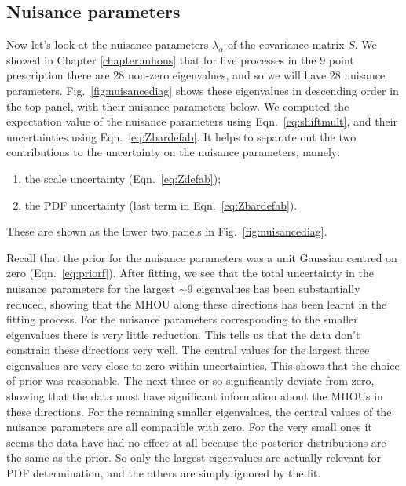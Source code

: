 \subsection{Nuisance parameters} 
Now let's look at the nuisance parameters $\lambda_\alpha$ of the covariance matrix $S$. We showed in Chapter \ref{chapter:mhous} that for five processes in the 9 point prescription there are 28 non-zero eigenvalues, and so we will have 28 nuisance parameters. Fig.~\ref{fig:nuisancediag} shows these eigenvalues in descending order in the top panel, with their nuisance parameters below. We computed the expectation value of the nuisance parameters using Eqn.~\ref{eq:shiftmult}, and their uncertainties using Eqn.~\ref{eq:Zbardefab}. 
It helps to separate out the two contributions to the uncertainty on the nuisance parameters, namely:
\begin{enumerate}
\item the scale uncertainty (Eqn.~\ref{eq:Zdefab});
\item the PDF uncertainty (last term in Eqn.~\ref{eq:Zbardefab}).
\end{enumerate}
These are shown as the lower two panels in Fig.~\ref{fig:nuisancediag}. 

Recall that the prior for the nuisance parameters was a unit Gaussian centred on zero (Eqn.~\ref{eq:priorf}). After fitting, we see that the total uncertainty in the nuisance parameters for the largest $\sim$9 eigenvalues has been substantially reduced, showing that the MHOU along these directions has been learnt in the fitting process. For the nuisance parameters corresponding to the smaller eigenvalues there is very little reduction. This tells us that the data don't constrain these directions very well. The central values for the largest three eigenvalues are very close to zero within uncertainties. This shows that the choice of prior was reasonable. The next three or so significantly deviate from zero, showing that the data must have significant information about the MHOUs in these directions. For the remaining smaller eigenvalues, the central values of the nuisance parameters are all compatible with zero. For the very small ones it seems the data have had no effect at all because the posterior distributions are the same as the prior. So only the largest eigenvalues are actually relevant for PDF determination, and the others are simply ignored by the fit.

